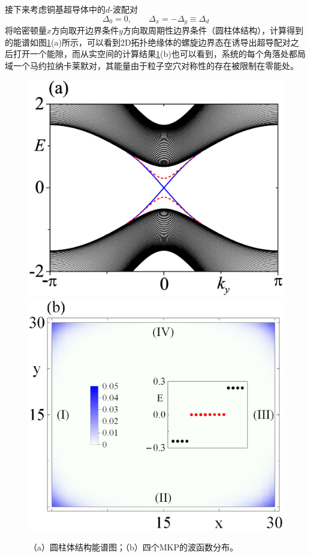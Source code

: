  接下来考虑铜基超导体中的$d$-波配对
\begin{equation}
\Delta_0=0,\qquad\Delta_x=-\Delta_y\equiv\Delta_d
\end{equation}
将哈密顿量$x$方向取开边界条件$y$方向取周期性边界条件（圆柱体结构），计算得到的能谱如图\ref{fig9}(a)所示，可以看到2D拓扑绝缘体的螺旋边界态在诱导出超导配对之后打开一个能隙，而从实空间的计算结果\ref{fig9}(b)也可以看到，系统的每个角落处都局域一个马约拉纳卡莱默对，其能量由于粒子空穴对称性的存在被限制在零能处。
\begin{figure}[h]
\centering
\includegraphics[scale=0.26]{pic/fig9}
\includegraphics[scale=0.5]{pic/fig10}
\caption{（a）圆柱体结构能谱图；（b）四个MKP的波函数分布\cite{re28}。}\label{fig9}
\end{figure}
